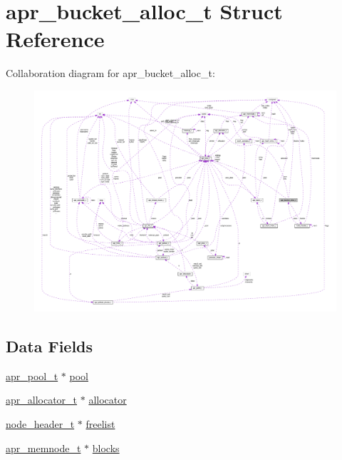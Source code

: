 \hypertarget{structapr__bucket__alloc__t}{}\section{apr\+\_\+bucket\+\_\+alloc\+\_\+t Struct Reference}
\label{structapr__bucket__alloc__t}


Collaboration diagram for apr\+\_\+bucket\+\_\+alloc\+\_\+t\+:
\nopagebreak
\begin{figure}[H]
\begin{center}
\leavevmode
\includegraphics[width=350pt]{structapr__bucket__alloc__t__coll__graph}
\end{center}
\end{figure}
\subsection*{Data Fields}
\begin{DoxyCompactItemize}
\item 
\hyperlink{structapr__pool__t}{apr\+\_\+pool\+\_\+t} $\ast$ \hyperlink{structapr__bucket__alloc__t_a5b0c350e0a447b0d11f7791a2fa4ca18}{pool}
\item 
\hyperlink{structapr__allocator__t}{apr\+\_\+allocator\+\_\+t} $\ast$ \hyperlink{structapr__bucket__alloc__t_ac1af5ffda5f17d2b26c145ecb17d9302}{allocator}
\item 
\hyperlink{structnode__header__t}{node\+\_\+header\+\_\+t} $\ast$ \hyperlink{structapr__bucket__alloc__t_a19eb6c76092973a9a96953e298498d90}{freelist}
\item 
\hyperlink{structapr__memnode__t}{apr\+\_\+memnode\+\_\+t} $\ast$ \hyperlink{structapr__bucket__alloc__t_a199c53596b0002c1be9c71550025c393}{blocks}
\end{DoxyCompactItemize}


